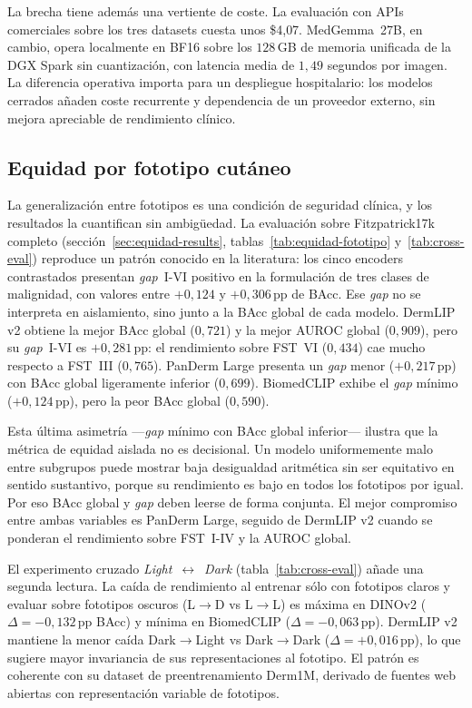 La brecha tiene además una vertiente de coste. La evaluación con
APIs comerciales sobre los tres datasets cuesta unos \$4{,}07.
MedGemma~27B, en cambio, opera localmente en BF16 sobre los
$128$\,GB de memoria unificada de la DGX Spark sin cuantización,
con latencia media de $1{,}49$ segundos por imagen. La diferencia
operativa importa para un despliegue hospitalario: los modelos
cerrados añaden coste recurrente y dependencia de un proveedor
externo, sin mejora apreciable de rendimiento clínico.

\subsection{Equidad por fototipo cutáneo}
\label{sec:disc-equidad}

La generalización entre fototipos es una condición de seguridad
clínica, y los resultados la cuantifican sin ambigüedad. La
evaluación sobre Fitzpatrick17k completo
(sección~\ref{sec:equidad-results}, tablas~\ref{tab:equidad-fototipo}
y~\ref{tab:cross-eval}) reproduce un patrón conocido en la
literatura: los cinco encoders contrastados presentan \emph{gap}~I-VI
positivo en la formulación de tres clases de malignidad, con valores
entre $+0{,}124$ y $+0{,}306$\,pp de BAcc. Ese \emph{gap} no se
interpreta en aislamiento, sino junto a la BAcc global de cada
modelo. DermLIP v2 obtiene la mejor BAcc global ($0{,}721$) y la
mejor AUROC global ($0{,}909$), pero su \emph{gap}~I-VI es
$+0{,}281$\,pp: el rendimiento sobre FST~VI ($0{,}434$) cae
mucho respecto a FST~III ($0{,}765$). PanDerm Large presenta un
\emph{gap} menor ($+0{,}217$\,pp) con BAcc global ligeramente
inferior ($0{,}699$). BiomedCLIP exhibe el \emph{gap} mínimo
($+0{,}124$\,pp), pero la peor BAcc global ($0{,}590$).

Esta última asimetría ---\emph{gap} mínimo con BAcc global
inferior--- ilustra que la métrica de equidad aislada no es
decisional. Un modelo uniformemente malo entre subgrupos puede
mostrar baja desigualdad aritmética sin ser equitativo en sentido
sustantivo, porque su rendimiento es bajo en todos los fototipos por
igual. Por eso BAcc global y \emph{gap} deben leerse de forma
conjunta. El mejor compromiso entre ambas variables es PanDerm
Large, seguido de DermLIP v2 cuando se ponderan el rendimiento sobre
FST~I-IV y la AUROC global.

El experimento cruzado \emph{Light}~$\leftrightarrow$~\emph{Dark}
(tabla~\ref{tab:cross-eval}) añade una segunda lectura. La caída de
rendimiento al entrenar sólo con fototipos claros y evaluar sobre
fototipos oscuros (L$\to$D vs L$\to$L) es máxima en DINOv2
($\Delta = -0{,}132$\,pp BAcc) y mínima en BiomedCLIP
($\Delta = -0{,}063$\,pp). DermLIP v2 mantiene la menor caída
Dark$\to$Light vs Dark$\to$Dark ($\Delta = +0{,}016$\,pp), lo que
sugiere mayor invariancia de sus representaciones al fototipo. El
patrón es coherente con su dataset de preentrenamiento Derm1M,
derivado de fuentes web abiertas con representación variable de
fototipos.

